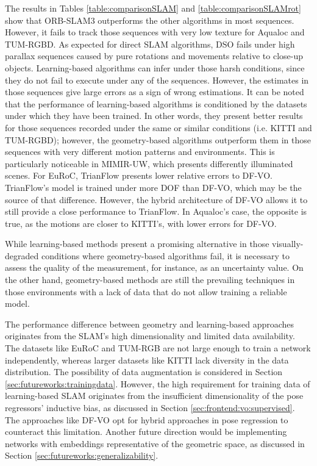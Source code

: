 The results in Tables \ref{table:comparisonSLAM} and \ref{table:comparisonSLAMrot} show that ORB-SLAM3 outperforms the other algorithms in most sequences. However, it fails to track those sequences with very low texture for Aqualoc and TUM-RGBD. As expected for direct SLAM algorithms, DSO fails under high parallax sequences caused by pure rotations and movements relative to close-up objects. Learning-based algorithms can infer under those harsh conditions, since they do not fail to execute under any of the sequences. However, the estimates in those sequences give large errors as a sign of wrong estimations.
It can be noted that the performance of learning-based algorithms is conditioned by the datasets under which they have been trained. In other words, they present better results for those sequences recorded under the same or similar conditions (i.e. KITTI and TUM-RGBD); however, the geometry-based algorithms outperform them in those sequences with very different motion patterns and environments. This is particularly noticeable in MIMIR-UW, which presents differently illuminated scenes. For EuRoC, TrianFlow presents lower relative errors to DF-VO. TrianFlow's model is trained under more \ac{DOF} than DF-VO, which may be the source of that difference. However, the hybrid architecture of DF-VO allows it to still provide a close performance to TrianFlow. In Aqualoc's case, the opposite is true, as the motions are closer to KITTI's, with lower errors for DF-VO.

While learning-based methods present a promising alternative in those visually-degraded conditions where geometry-based algorithms fail, it is necessary to assess the quality of the measurement, for instance, as an uncertainty value. On the other hand, geometry-based methods are still the prevailing techniques in those environments with a lack of data that do not allow training a reliable model.

The performance difference between geometry and learning-based approaches originates from the SLAM’s high dimensionality and limited data availability. The datasets like EuRoC and TUM-RGB are not large enough to train a network independently, whereas larger datasets like KITTI lack diversity in the data distribution.  The possibility of data augmentation is considered in Section \ref{sec:futureworks:trainingdata}. However, the high requirement for training data of learning-based SLAM originates from the
insufficient dimensionality of the pose regressors’ inductive bias, as discussed in Section \ref{sec:frontend:vo:supervised}. The approaches like DF-VO opt for hybrid approaches in pose regression to counteract this limitation. Another future direction would be implementing networks with embeddings representative of the geometric space, as discussed in Section \ref{sec:futureworks:generalizability}.



